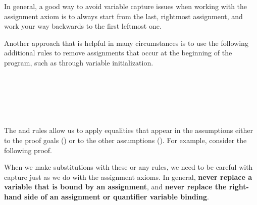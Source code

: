 \documentclass[11pt,twoside]{scrartcl}
\begin{document}
In general, a good way to avoid variable capture issues when working with the assignment axiom is to always start from the last, rightmost assignment, and work your way backwards to the first leftmost one.

Another approach that is helpful in many circumstances is to use the following additional rules to remove assignments that occur at the beginning of the program, such as through variable initialization.
\\

  \begin{calculus}
    {
      {}
    }{}%
  \end{calculus}~~~~%
  \begin{calculus}
    {
      {}
    }{}%
  \end{calculus}~~~~%
  \begin{calculus}
  {
    {\lsequent[L]{} {}}
   ~~
  }
  {}
  \end{calculus}

\vspace{1ex}
The  and  rules allow us to apply equalities that appear in the assumptions either to the proof goals () or to the other assumptions ().
For example, consider the following proof.
\begin{sequentdeduction}[array]
 {
}
\end{sequentdeduction}
When we make substitutions with these or any rules, we need to be careful with capture just as we do with the assignment axioms.
In general, \textbf{never replace a variable that is bound by an assignment}, and \textbf{never replace the right-hand side of an assignment or quantifier variable binding}.
\end{document}
